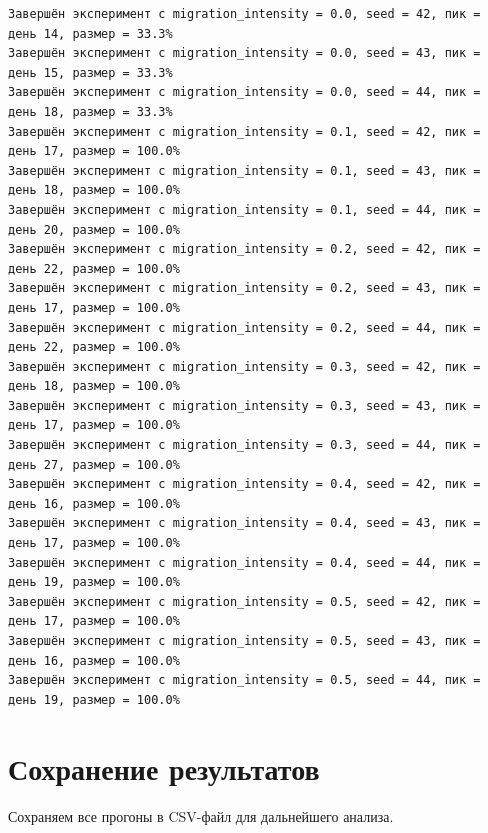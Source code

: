 \documentclass[
  12pt,
  a4paper,
  DIV=11,
  numbers=noendperiod]{scrreprt}
\newenvironment{Shaded}{\begin{snugshade}}{\end{snugshade}}
\newcommand{\FunctionTok}[1]{\textcolor[rgb]{0.28,0.35,0.67}{#1}}
\newcommand{\NormalTok}[1]{\textcolor[rgb]{0.00,0.23,0.31}{#1}}
\newcommand{\OperatorTok}[1]{\textcolor[rgb]{0.37,0.37,0.37}{#1}}
\newcommand{\SpecialCharTok}[1]{\textcolor[rgb]{0.37,0.37,0.37}{#1}}
\newcommand{\StringTok}[1]{\textcolor[rgb]{0.13,0.47,0.30}{#1}}
\begin{document}
\begin{verbatim}
Завершён эксперимент с migration_intensity = 0.0, seed = 42, пик = день 14, размер = 33.3%
Завершён эксперимент с migration_intensity = 0.0, seed = 43, пик = день 15, размер = 33.3%
Завершён эксперимент с migration_intensity = 0.0, seed = 44, пик = день 18, размер = 33.3%
Завершён эксперимент с migration_intensity = 0.1, seed = 42, пик = день 17, размер = 100.0%
Завершён эксперимент с migration_intensity = 0.1, seed = 43, пик = день 18, размер = 100.0%
Завершён эксперимент с migration_intensity = 0.1, seed = 44, пик = день 20, размер = 100.0%
Завершён эксперимент с migration_intensity = 0.2, seed = 42, пик = день 22, размер = 100.0%
Завершён эксперимент с migration_intensity = 0.2, seed = 43, пик = день 17, размер = 100.0%
Завершён эксперимент с migration_intensity = 0.2, seed = 44, пик = день 22, размер = 100.0%
Завершён эксперимент с migration_intensity = 0.3, seed = 42, пик = день 18, размер = 100.0%
Завершён эксперимент с migration_intensity = 0.3, seed = 43, пик = день 17, размер = 100.0%
Завершён эксперимент с migration_intensity = 0.3, seed = 44, пик = день 27, размер = 100.0%
Завершён эксперимент с migration_intensity = 0.4, seed = 42, пик = день 16, размер = 100.0%
Завершён эксперимент с migration_intensity = 0.4, seed = 43, пик = день 17, размер = 100.0%
Завершён эксперимент с migration_intensity = 0.4, seed = 44, пик = день 19, размер = 100.0%
Завершён эксперимент с migration_intensity = 0.5, seed = 42, пик = день 17, размер = 100.0%
Завершён эксперимент с migration_intensity = 0.5, seed = 43, пик = день 16, размер = 100.0%
Завершён эксперимент с migration_intensity = 0.5, seed = 44, пик = день 19, размер = 100.0%
\end{verbatim}

\section{Сохранение
результатов}\label{ux441ux43eux445ux440ux430ux43dux435ux43dux438ux435-ux440ux435ux437ux443ux43bux44cux442ux430ux442ux43eux432-2}

Сохраняем все прогоны в CSV-файл для дальнейшего анализа.

\begin{Shaded}
\end{Shaded}
\end{document}
